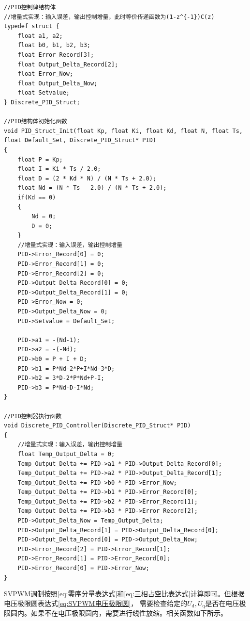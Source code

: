 \begin{lstlisting}
//PID控制律结构体
//增量式实现：输入误差，输出控制增量，此时等价传递函数为(1-z^{-1})C(z)
typedef struct {
    float a1, a2;
    float b0, b1, b2, b3;
    float Error_Record[3];
    float Output_Delta_Record[2];
    float Error_Now;
    float Output_Delta_Now;
    float Setvalue;
} Discrete_PID_Struct;

//PID结构体初始化函数
void PID_Struct_Init(float Kp, float Ki, float Kd, float N, float Ts, float Default_Set, Discrete_PID_Struct* PID)
{
    float P = Kp;
    float I = Ki * Ts / 2.0;
    float D = (2 * Kd * N) / (N * Ts + 2.0);
    float Nd = (N * Ts - 2.0) / (N * Ts + 2.0);
    if(Kd == 0)
    {
        Nd = 0;
        D = 0;
    }
    //增量式实现：输入误差，输出控制增量
    PID->Error_Record[0] = 0;
    PID->Error_Record[1] = 0;
    PID->Error_Record[2] = 0;
    PID->Output_Delta_Record[0] = 0;
    PID->Output_Delta_Record[1] = 0;
    PID->Error_Now = 0;
    PID->Output_Delta_Now = 0;
    PID->Setvalue = Default_Set;

    PID->a1 = -(Nd-1);
    PID->a2 = -(-Nd);
    PID->b0 = P + I + D;
    PID->b1 = P*Nd-2*P+I*Nd-3*D;
    PID->b2 = 3*D-2*P*Nd+P-I;
    PID->b3 = P*Nd-D-I*Nd;
}

//PID控制器执行函数
void Discrete_PID_Controller(Discrete_PID_Struct* PID)
{
    //增量式实现：输入误差，输出控制增量
    float Temp_Output_Delta = 0;
    Temp_Output_Delta += PID->a1 * PID->Output_Delta_Record[0];
    Temp_Output_Delta += PID->a2 * PID->Output_Delta_Record[1];
    Temp_Output_Delta += PID->b0 * PID->Error_Now;
    Temp_Output_Delta += PID->b1 * PID->Error_Record[0];
    Temp_Output_Delta += PID->b2 * PID->Error_Record[1];
    Temp_Output_Delta += PID->b3 * PID->Error_Record[2];
    PID->Output_Delta_Now = Temp_Output_Delta;
    PID->Output_Delta_Record[1] = PID->Output_Delta_Record[0];
    PID->Output_Delta_Record[0] = PID->Output_Delta_Now;
    PID->Error_Record[2] = PID->Error_Record[1];
    PID->Error_Record[1] = PID->Error_Record[0];
    PID->Error_Record[0] = PID->Error_Now;
}
\end{lstlisting}

SVPWM调制按照\eqref{eq:零序分量表达式}和\eqref{eq:三相占空比表达式}计算即可。但根据电压极限圆表达式\eqref{eq:SVPWM电压极限圆}，
需要检查给定的\(U_{\mathrm{d}},U_{\mathrm{q}}\)是否在电压极限圆内。如果不在电压极限圆内，需要进行线性放缩。相关函数如下所示。

